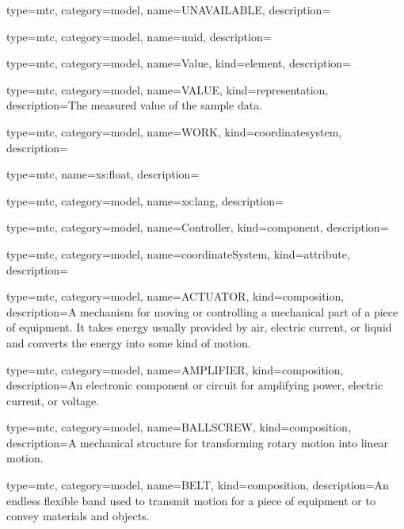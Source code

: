 {
  type=mtc,
  category=model,
  name={UNAVAILABLE},
  description={}
}


{
  type=mtc,
  category=model,
  name={uuid},
  description={}
}



{
  type=mtc,
  category=model,
  name={Value},
  kind={element},
  description={}
}


{
  type=mtc,
  category=model,
  name={VALUE},
  kind={representation},
  description={The measured value of the sample data.}
}


{
  type=mtc,
  category=model,
  name={WORK},
  kind={coordinatesystem},
  description={}
}


{
  type=mtc,
  name={xs:float},
  description={}
}


{
  type=mtc,
  category=model,
  name={xs:lang},
  description={}
}


{
  type=mtc,
  category=model,
  name={Controller},
  kind={component},
  description= {}
}


{
  type=mtc,
  category=model,
  name={coordinateSystem},
  kind={attribute},
  description={}
}


{
  type=mtc,
  category=model,
  name={ACTUATOR},
  kind={composition},
  description={A mechanism for moving or controlling a mechanical part of a piece of equipment.   \newline It takes energy usually provided by air, electric current, or liquid and converts the energy into some kind of motion.  }
}


{
  type=mtc,
  category=model,
  name={AMPLIFIER},
  kind={composition},
  description={An electronic component or circuit for amplifying power, electric current, or voltage.}
}


{
  type=mtc,
  category=model,
  name={BALLSCREW},
  kind={composition},
  description={A mechanical structure for transforming rotary motion into linear motion.}
}


{
  type=mtc,
  category=model,
  name={BELT},
  kind={composition},
  description={An endless flexible band used to transmit motion for a piece of equipment or to convey materials and objects.}
}


